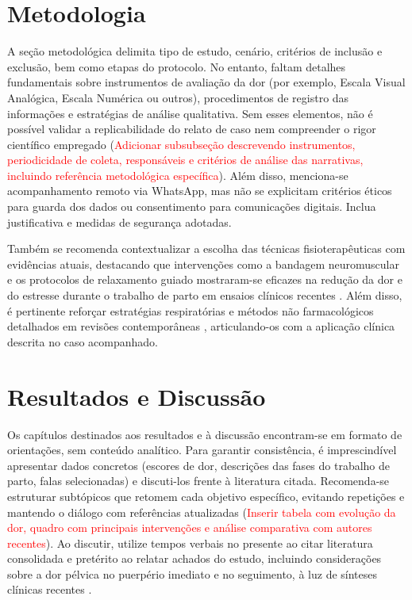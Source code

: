 \documentclass[12pt,oneside,a4paper]{article}
\begin{document}
\section*{Metodologia}
A seção metodológica delimita tipo de estudo, cenário, critérios de inclusão e exclusão, bem como etapas do protocolo. No entanto, faltam detalhes fundamentais sobre instrumentos de avaliação da dor (por exemplo, Escala Visual Analógica, Escala Numérica ou outros), procedimentos de registro das informações e estratégias de análise qualitativa. Sem esses elementos, não é possível validar a replicabilidade do relato de caso nem compreender o rigor científico empregado (\textcolor{red}{Adicionar subsubseção descrevendo instrumentos, periodicidade de coleta, responsáveis e critérios de análise das narrativas, incluindo referência metodológica específica}). Além disso, menciona-se acompanhamento remoto via WhatsApp, mas não se explicitam critérios éticos para guarda dos dados ou consentimento para comunicações digitais. Inclua justificativa e medidas de segurança adotadas.

Também se recomenda contextualizar a escolha das técnicas fisioterapêuticas com evidências atuais, destacando que intervenções como a bandagem neuromuscular e os protocolos de relaxamento guiado mostraram-se eficazes na redução da dor e do estresse durante o trabalho de parto em ensaios clínicos recentes \cite{miquelutti2018,kaple2023}. Além disso, é pertinente reforçar estratégias respiratórias e métodos não farmacológicos detalhados em revisões contemporâneas \cite{park2021,euzebioklein2022}, articulando-os com a aplicação clínica descrita no caso acompanhado.

\section*{Resultados e Discussão}
Os capítulos destinados aos resultados e à discussão encontram-se em formato de orientações, sem conteúdo analítico. Para garantir consistência, é imprescindível apresentar dados concretos (escores de dor, descrições das fases do trabalho de parto, falas selecionadas) e discuti-los frente à literatura citada. Recomenda-se estruturar subtópicos que retomem cada objetivo específico, evitando repetições e mantendo o diálogo com referências atualizadas (\textcolor{red}{Inserir tabela com evolução da dor, quadro com principais intervenções e análise comparativa com autores recentes}). Ao discutir, utilize tempos verbais no presente ao citar literatura consolidada e pretérito ao relatar achados do estudo, incluindo considerações sobre a dor pélvica no puerpério imediato e no seguimento, à luz de sínteses clínicas recentes \cite{hroncova2023}.
\end{document}
